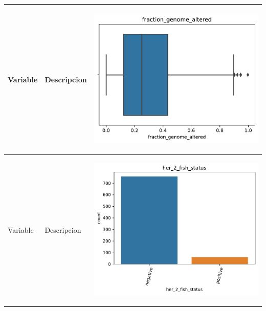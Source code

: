 \begin{table}[!htb]
\begin{threeparttable}
\begin{tabular}{p{2.5cm} p{7cm} p{6.5cm}}
			Variable
			& Descripcion
			
			& \begin{center}\includegraphics[width=1\linewidth]{NOTEBOOK/IMAGENES_DESCRIPTIVAS/17_fraction_genome_altered}\end{center}
			\\ \hline
			
			Variable
			& Descripcion
			& \begin{center}\includegraphics[width=1\linewidth]{NOTEBOOK/IMAGENES_DESCRIPTIVAS/19_her_2_fish_status}\end{center}
			\\ \hline
		\end{tabular}
	\end{threeparttable}
\end{table}







